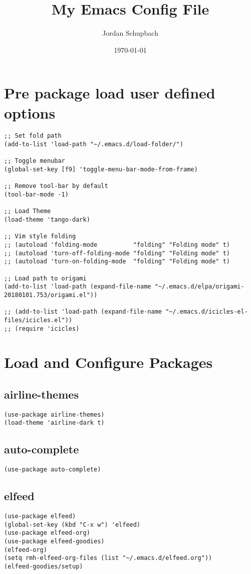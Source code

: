\documentclass[11pt]{article}
\author{Jordan Schupbach}
\date{\today}
\title{My Emacs Config File}
\begin{document}
\maketitle
\tableofcontents


\section{Pre package load user defined options}
\label{sec:orge4e991c}


\begin{verbatim}
;; Set fold path
(add-to-list 'load-path "~/.emacs.d/load-folder/")

;; Toggle menubar
(global-set-key [f9] 'toggle-menu-bar-mode-from-frame)

;; Remove tool-bar by default
(tool-bar-mode -1)

;; Load Theme
(load-theme 'tango-dark)

;; Vim style folding
;; (autoload 'folding-mode          "folding" "Folding mode" t)
;; (autoload 'turn-off-folding-mode "folding" "Folding mode" t)
;; (autoload 'turn-on-folding-mode  "folding" "Folding mode" t)

;; Load path to origami
(add-to-list 'load-path (expand-file-name "~/.emacs.d/elpa/origami-20180101.753/origami.el"))

;; (add-to-list 'load-path (expand-file-name "~/.emacs.d/icicles-el-files/icicles.el"))
;; (require 'icicles)
\end{verbatim}

\section{Load and Configure Packages}
\label{sec:org7085195}
\subsection{airline-themes}
\label{sec:org820221b}
\begin{verbatim}
(use-package airline-themes)
(load-theme 'airline-dark t)
\end{verbatim}
\subsection{auto-complete}
\label{sec:org0fc9d5b}
\begin{verbatim}
(use-package auto-complete)
\end{verbatim}
\subsection{elfeed}
\label{sec:org6e3bba4}
\begin{verbatim}
(use-package elfeed)
(global-set-key (kbd "C-x w") 'elfeed)
(use-package elfeed-org)
(use-package elfeed-goodies)
(elfeed-org)
(setq rmh-elfeed-org-files (list "~/.emacs.d/elfeed.org"))
(elfeed-goodies/setup)
\end{verbatim}
\end{document}
